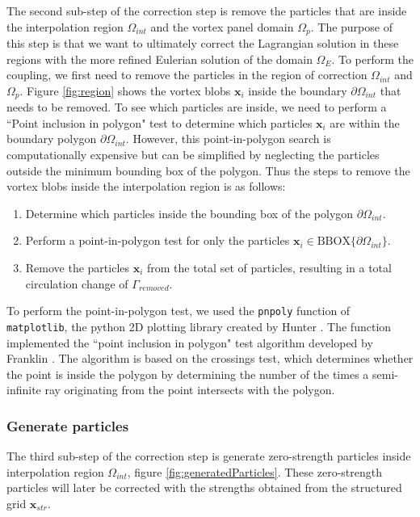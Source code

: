 The second sub-step of the correction step is remove the particles that are inside the interpolation region $\Omega_{int}$ and the vortex panel domain $\Omega_p$. The purpose of this step is that we want to ultimately correct the Lagrangian solution in these regions with the more refined Eulerian solution of the domain $\Omega_E$. To perform the coupling, we first need to remove the particles in the region of correction $\Omega_{int}$ and $\Omega_p$. Figure \ref{fig:region} shows the vortex blobs $\mathbf{x}_i$ inside the boundary $\partial \Omega_{int}$ that needs to be removed. To see which particles are inside, we need to perform a ``Point inclusion in polygon" test to determine which particles $\mathbf{x}_i$ are within the boundary polygon $\partial \Omega_{int}$. However, this point-in-polygon search is computationally expensive but can be simplified by neglecting the particles outside the minimum bounding box of the polygon. Thus the steps to remove the vortex blobs inside the interpolation region is as follows:
\begin{enumerate}
\item Determine which particles inside the bounding box of the polygon $\partial \Omega_{int}$. 
\item Perform a point-in-polygon test for only the particles $\mathbf{x}_i \in \mathrm{BBOX}\{\partial \Omega_{int}\}$.
\item Remove the particles $\mathbf{x}_i$ from the total set of particles, resulting in a total circulation change of $\Gamma_{removed}$.
\end{enumerate}

To perform the point-in-polygon test, we used the \texttt{pnpoly} function of \texttt{matplotlib}, the python 2D plotting library created by Hunter \cite{Hunter:2007}. The function implemented the ``point inclusion in polygon" test algorithm developed by Franklin \cite{franklin2006pnpoly}. The algorithm is based on the crossings test, which determines whether the point is inside the polygon by determining the number of the times a semi-infinite ray originating from the point intersects with the polygon.

\subsubsection*{Generate particles}

The third sub-step of the correction step is generate zero-strength particles inside interpolation region $\Omega_{int}$, figure \ref{fig:generatedParticles}. These zero-strength particles will later be corrected with the strengths obtained from the structured grid $\mathbf{x}_{str}$.

